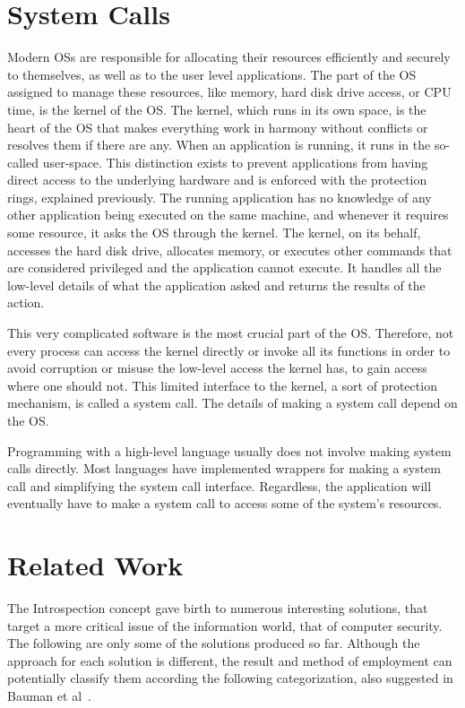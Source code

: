 \section{System Calls}\label{sec:syscalls}
Modern \ac{OS}s are responsible for allocating their resources efficiently and securely to themselves, as well as to the user level applications. The part of the \ac{OS} assigned to manage these resources, like memory, hard disk drive access, or \ac{CPU} time, is the kernel of the \ac{OS}. The kernel, which runs in its own space, is the heart of the \ac{OS} that makes everything work in harmony without conflicts or resolves them if there are any. When an application is running, it runs in the so-called user-space. This distinction exists to prevent applications from having direct access to the underlying hardware and is enforced with the protection rings, explained previously. The running application has no knowledge of any other application being executed on the same machine, and whenever it requires some resource, it asks the \ac{OS} through the kernel. The kernel, on its behalf, accesses the hard disk drive, allocates memory, or executes other commands that are considered privileged and the application cannot execute. It handles all the low-level details of what the application asked and returns the results of the action. 

\par This very complicated software is the most crucial part of the \ac{OS}. Therefore, not every process can access the kernel directly or invoke all its functions in order to avoid corruption or misuse the low-level access the kernel has, to gain access where one should not. This limited interface to the kernel, a sort of protection mechanism, is called a system call. The details of making a system call depend on the \ac{OS}.

\par Programming with a high-level language usually does not involve making system calls directly. Most languages have implemented wrappers for making a system call and simplifying the system call interface. Regardless, the application will eventually have to make a system call to access some of the system's resources.


\section{Related Work}\label{sec:related}
The Introspection concept gave birth to numerous interesting solutions, that target a more critical issue of the information world, that of computer security. The following are only some of the solutions produced so far. Although the approach for each solution is different, the result and method of employment can potentially classify them according the following categorization, also suggested in Bauman et al~\cite{bauman2015survey}.

